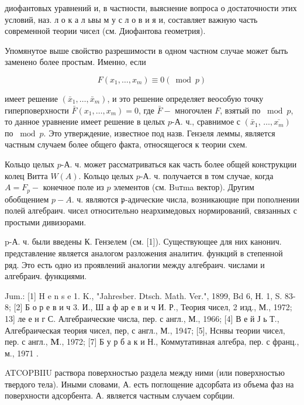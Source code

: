 \documentclass[10pt]{article}
\begin{document}
диофантовых уравнений и, в частности, выяснение вопроса о достаточности этих условий, наз. л о к а л ьвы м у с л о в и я и, составляет важную часть современной теории чисел (см. Диофантова геометрия).



Упомянутое выше свойство разрешимости в одном частном случае может быть заменено более простым. Именно, если



\[

F\left(x_{1}, \ldots, x_{m}\right) \equiv 0(\bmod p)

\]



имеет решение $\left(\bar{x}_{1}, \ldots, \bar{x}_{m}\right)$, и это решение определяет веособую точку гиперповерхности $\bar{F}\left(x_{1}, \ldots, x_{m}\right)=0$, где $\bar{F}-$ многочлен $F$, взятый по $\bmod p$, то данное уравнение имеет решение в целых $p$-А. ч., сравнимое с $\left(\bar{x}_{1}\right.$, $\left.\ldots, \overline{x_{m}}\right)$ по $\bmod p$. Это утверждение, известное под назв. Гензеля леммы, является частным случаем более общего факта, относящегося к теории схем.



Кольцо целых $p$-А. ч. может рассматриваться как часть более общей конструкции колец Витта $W(A)$. Кольцо целых $p$-А. ч. получается в том случае, когда $A=F_{p}-$ конечное поле из $p$ элементов (см. Buтma вектор). Другим обобщением $p-A$. ч. являются $\mathfrak{p}$-адические числа, возникающие при пополнении полей алгебраич. чисел относительно неархимедовых нормирований, связанных с простыми дивизорами.



p-А. ч. были введены К. Гензелем (см. [1]). Существующее для них канонич. представление является аналогом разложения аналитич. функций в степенной ряд. Это есть одно из проявлений аналогии между алгебраич. числами и алгебраич. функциями.



Jum.: [1] H e n s e 1. K., "Jahresber. Dtsch. Math. Ver.", 1899, Bd 6, Н. 1, S. 83-8; [2] Б о р е в и ч 3. И., Ш а ф ар е в и ч И. Р., Теория чисел, 2 изд., М., 1972; 13] ле е н г С. Алгебраические числа, пер. с англ., М., 1966; [4] В е й Ј ь Т., Алгебраическая теория чисел, пер, с англ., М., 1947; [5], Нснвы теории чисел, пер. с англ., $\mathbf{M}$., 1972; [7] Б у р б а к и Н., Коммутативная алгебра, пер. с франц., м., 1971 .



ATCOPBIIU раствора поверхностью раздела между ними (или поверхностью твердого тела). Иными словами, А. есть поглощение адсорбата из объема фаз на поверхности адсорбента. А. является частным случаем сорбции.
\end{document}
